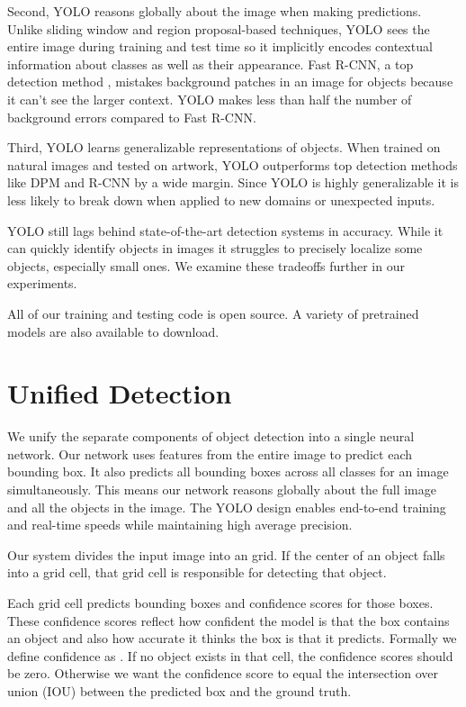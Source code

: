 \documentclass[10pt,twocolumn,letterpaper]{article}
\begin{document}
Second, YOLO reasons globally about the image when making predictions. Unlike sliding window and region proposal-based techniques, YOLO sees the entire image during training and test time so it implicitly encodes contextual information about classes as well as their appearance. Fast R-CNN, a top detection method \cite{DBLP:journals/corr/Girshick15}, mistakes background patches in an image for objects because it can't see the larger context. YOLO makes less than half the number of background errors compared to Fast R-CNN.

Third, YOLO learns generalizable representations of objects. When trained on natural images and tested on artwork, YOLO outperforms top detection methods like DPM and R-CNN by a wide margin. Since YOLO is highly generalizable it is less likely to break down when applied to new domains or unexpected inputs.

YOLO still lags behind state-of-the-art detection systems in accuracy. While it can quickly identify objects in images it struggles to precisely localize some objects, especially small ones. We examine these tradeoffs further in our experiments.

All of our training and testing code is open source.
A variety of pretrained models are also available to download.

\section{Unified Detection}

We unify the separate components of object detection into a single neural network. Our network uses features from the entire image to predict each bounding box. It also predicts all bounding boxes across all classes for an image simultaneously. This means our network reasons globally about the full image and all the objects in the image. The YOLO design enables end-to-end training and real-time speeds while maintaining high average precision.

Our system divides the input image into an  grid. If the center of an object falls into a grid cell, that grid cell is responsible for detecting that object.

Each grid cell predicts  bounding boxes and confidence scores for those boxes. These confidence scores reflect how confident the model is that the box contains an object and also how accurate it thinks the box is that it predicts. Formally we define confidence as . If no object exists in that cell, the confidence scores should be zero. Otherwise we want the confidence score to equal the intersection over union (IOU) between the predicted box and the ground truth.
\end{document}
